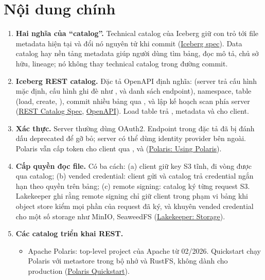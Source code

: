 \section{Nội dung chính}
\begin{enumerate}
  \item \textbf{Hai nghĩa của ``catalog''.} Technical catalog của Iceberg giữ con trỏ tới file metadata hiện tại và đổi nó nguyên tử khi commit (\href{https://iceberg.apache.org/spec/}{Iceberg spec}). Data catalog hay nền tảng metadata giúp người dùng tìm bảng, đọc mô tả, chủ sở hữu, lineage; nó không thay technical catalog trong đường commit.
  \item \textbf{Iceberg REST catalog.} Đặc tả OpenAPI định nghĩa:  (server trả cấu hình mặc định, cấu hình ghi đè như , và danh sách endpoint), namespace, table (load, create, ), commit nhiều bảng qua , và lập kế hoạch scan phía server (\href{https://iceberg.apache.org/rest-catalog-spec/}{REST Catalog Spec}, \href{https://github.com/apache/iceberg/blob/main/open-api/rest-catalog-open-api.yaml}{OpenAPI}). Load table trả , metadata và  cho client.
  \item \textbf{Xác thực.} Server thường dùng OAuth2. Endpoint  trong đặc tả đã bị đánh dấu deprecated để gỡ bỏ; server có thể dùng identity provider bên ngoài. Polaris vẫn cấp token cho client qua ,  và  (\href{https://polaris.apache.org/releases/1.1.0/getting-started/using-polaris/}{Polaris: Using Polaris}).
  \item \textbf{Cấp quyền đọc file.} Có ba cách: (a) client giữ key S3 tĩnh, đi vòng được qua catalog; (b) vended credential: client gửi  và catalog trả credential ngắn hạn theo quyền trên bảng; (c) remote signing: catalog ký từng request S3. Lakekeeper ghi rằng remote signing chỉ giữ client trong phạm vi bảng khi object store kiểm mọi phần của request đã ký, và khuyên vended credential cho một số storage như MinIO, SeaweedFS (\href{https://docs.lakekeeper.io/docs/nightly/storage/}{Lakekeeper: Storage}).
  \item \textbf{Các catalog triển khai REST.}
  \begin{itemize}
    \item Apache Polaris: top-level project của Apache từ 02/2026. Quickstart chạy Polaris với metastore trong bộ nhớ và RustFS, không dành cho production (\href{https://polaris.apache.org/guides/quickstart/}{Polaris Quickstart}).

\end{itemize}
\end{enumerate}
